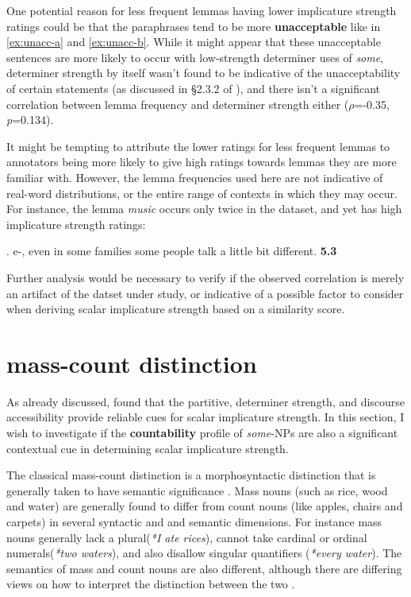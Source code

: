 \documentclass[10pt, biblatex]{report}
\begin{document}
One potential reason for less frequent lemmas
having lower implicature strength ratings could be that the paraphrases tend to be
more \textbf{unacceptable} like in \ref{ex:unacc-a} and \ref{ex:unacc-b}. While it might
appear that these unacceptable sentences are more likely to occur with
low-strength determiner uses of \textit{some}, determiner
strength by itself wasn't found to be indicative of the unacceptability of
certain statements (as discussed in \S 2.3.2 of \citet{degen_investigating_2015}
), and there isn't a significant correlation between lemma frequency and
determiner strength either ($\rho$=-0.35, \textit{p}=0.134).

It might be tempting to attribute the lower ratings for less frequent lemmas to
annotators being more likely to give high ratings towards lemmas
they are more familiar with. However, the
lemma frequencies used here are not indicative of real-word distributions, or the
entire range of contexts in which they may occur. For instance, the lemma
\textit{music} occurs only twice in the dataset, and yet has high
implicature strength ratings:

\ex. e-, even in some families some people talk a little bit different. \hfill \textbf{5.3}

Further analysis would be necessary to verify if the observed correlation is
merely an artifact of the datset under study, or indicative of a possible
factor to consider when deriving scalar implicature strength based on a
similarity score.

\section{mass-count distinction}
\label{sec:masscount}

As already discussed, \citet{degen_investigating_2015} found that the
partitive, determiner strength, and discourse accessibility provide reliable cues
for scalar implicature strength. In this section, I wish to investigate if the
\textbf{countability} profile of \textit{some}-NPs are also a significant
contextual cue in determining scalar implicature strength.

The classical mass-count distinction is a morphosyntactic distinction that is
generally taken to have semantic significance \citep{moltmann2020}. Mass nouns
(such as rice, wood and water) are generally found to differ from count nouns
(like apples, chairs and carpets) in several syntactic and and semantic
dimensions. For instance mass nouns generally lack a plural(\textit{*I ate rices}),
cannot take cardinal or ordinal numerals(\textit{*two waters}), and also disallow
singular quantifiers (\textit{*every water}). The semantics of mass and count nouns
are also different, although there are differing views on how to interpret the
distinction between the two \citep{moltmann1998part,moltmann1998part,
link2002logical,champollion2016mereology,champollion2017parts,krifka1989nominal,
moltmann2020}.
\end{document}
